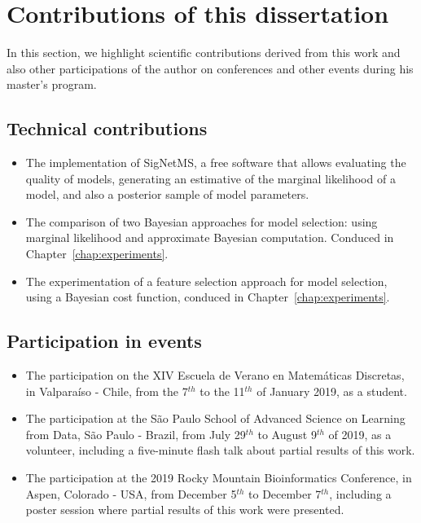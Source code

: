 \section{Contributions of this dissertation}
In this section, we highlight scientific contributions derived from this
work and also other participations of the author on conferences and
other events during his master's program.

\subsection{Technical contributions}
\begin{itemize}
\item{The implementation of SigNetMS, a free software that allows
    evaluating the quality of models, generating an estimative of the
    marginal likelihood of a model, and also a posterior sample of model
    parameters.}
\item{The comparison of two Bayesian approaches for model selection:
    using marginal likelihood and approximate Bayesian computation.
    Conduced in Chapter~\ref{chap:experiments}.}
\item{The experimentation of a feature selection approach for model
    selection, using a Bayesian cost function, conduced in
    Chapter~\ref{chap:experiments}.}
\end{itemize}

\subsection{Participation in events}
\begin{itemize}
\item{The participation on the XIV Escuela de Verano en Matemáticas
    Discretas, in Valparaíso - Chile, from the 7$^{th}$ to the
    11$^{th}$ of January 2019, as a student.}
\item{The participation at the São Paulo School of Advanced Science on 
    Learning from Data, São Paulo - Brazil, from July 29$^{th}$ to
    August 9$^{th}$ of 2019, as a volunteer, including a 
    five-minute flash talk about partial results of this work.}
\item{The participation at the 2019 Rocky Mountain Bioinformatics 
    Conference, in Aspen, Colorado - USA, from December 5$^{th}$ to
    December 7$^{th}$, including a poster session where partial results 
    of this work were presented.}
\end{itemize}


